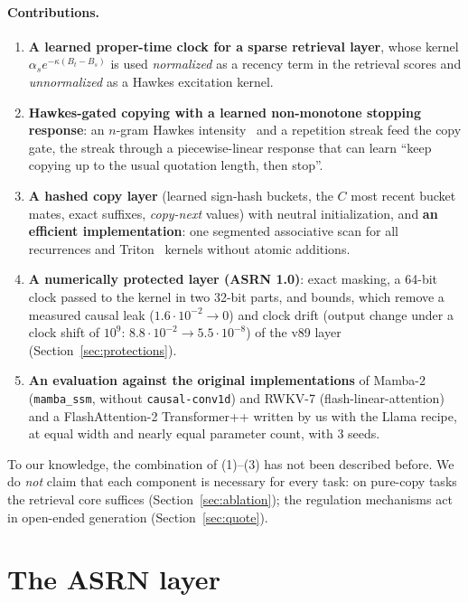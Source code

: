\documentclass[11pt]{article}
\begin{document}
\paragraph{Contributions.}
\begin{enumerate}[label=(\arabic*)]
\item \textbf{A learned proper-time clock for a sparse retrieval layer}, whose kernel
  $\alpha_s e^{-\kappa(B_t-B_s)}$ is used \emph{normalized} as a recency term in the retrieval scores and
  \emph{unnormalized} as a Hawkes excitation kernel.
\item \textbf{Hawkes-gated copying with a learned non-monotone stopping response}: an $n$-gram Hawkes
  intensity~\cite{hawkes1971spectra} and a repetition streak feed the copy gate, the streak through a piecewise-linear
  response that can learn ``keep copying up to the usual quotation length, then stop''.
\item \textbf{A hashed copy layer} (learned sign-hash buckets, the $C$ most recent bucket mates, exact suffixes,
  \emph{copy-next} values) with neutral initialization, and \textbf{an efficient implementation}: one segmented
  associative scan for all recurrences and Triton~\cite{tillet2019triton} kernels without atomic additions.
\item \textbf{A numerically protected layer (ASRN 1.0)}: exact masking, a 64-bit clock passed to the kernel in two
  32-bit parts, and bounds, which remove a measured causal leak ($1.6\cdot10^{-2}\to0$) and clock drift (output change
  under a clock shift of $10^9$: $8.8\cdot10^{-2}\to5.5\cdot10^{-8}$) of the v89 layer (Section~\ref{sec:protections}).
\item \textbf{An evaluation against the original implementations} of Mamba-2 (\texttt{mamba\_ssm}, without
  \texttt{causal-conv1d}) and RWKV-7 (flash-linear-attention) and a FlashAttention-2 Transformer++ written by us with
  the Llama recipe, at equal width and nearly equal parameter count, with 3 seeds.
\end{enumerate}
To our knowledge, the combination of (1)--(3) has not been described before. We do \emph{not} claim that each component
is necessary for every task: on pure-copy tasks the retrieval core suffices (Section~\ref{sec:ablation}); the regulation
mechanisms act in open-ended generation (Section~\ref{sec:quote}).

\section{The ASRN layer}
\label{sec:method}
\end{document}
